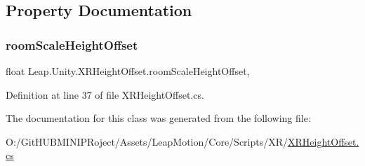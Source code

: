 \subsection{Property Documentation}
\mbox{\label{class_leap_1_1_unity_1_1_x_r_height_offset_a1e2ab3d404c464995b8686af7ef82af8}} 
\subsubsection{\texorpdfstring{roomScaleHeightOffset}{roomScaleHeightOffset}}
{\footnotesize\ttfamily float Leap.\+Unity.\+X\+R\+Height\+Offset.\+room\+Scale\+Height\+Offset\hspace{0.3cm}{\ttfamily [get]}, {\ttfamily [set]}}



Definition at line 37 of file X\+R\+Height\+Offset.\+cs.



The documentation for this class was generated from the following file\+:\begin{DoxyCompactItemize}
\item 
O\+:/\+Git\+H\+U\+B\+M\+I\+N\+I\+P\+Roject/\+Assets/\+Leap\+Motion/\+Core/\+Scripts/\+X\+R/\mbox{\hyperlink{_x_r_height_offset_8cs}{X\+R\+Height\+Offset.\+cs}}\end{DoxyCompactItemize}
